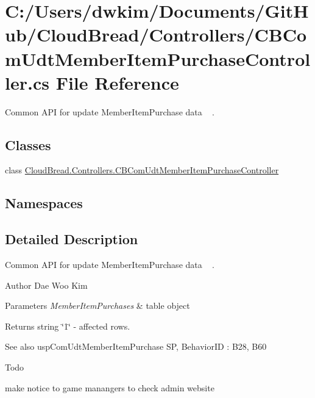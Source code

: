 \hypertarget{a00138}{}\section{C\+:/\+Users/dwkim/\+Documents/\+Git\+Hub/\+Cloud\+Bread/\+Controllers/\+C\+B\+Com\+Udt\+Member\+Item\+Purchase\+Controller.cs File Reference}
\label{a00138}


Common A\+PI for update Member\+Item\+Purchase data ~\newline
.  


\subsection*{Classes}
\begin{DoxyCompactItemize}
\item 
class \hyperlink{a00026}{Cloud\+Bread.\+Controllers.\+C\+B\+Com\+Udt\+Member\+Item\+Purchase\+Controller}
\end{DoxyCompactItemize}
\subsection*{Namespaces}
\begin{DoxyCompactItemize}
\end{DoxyCompactItemize}


\subsection{Detailed Description}
Common A\+PI for update Member\+Item\+Purchase data ~\newline
. 

\begin{DoxyAuthor}{Author}
Dae Woo Kim 
\end{DoxyAuthor}

\begin{DoxyParams}{Parameters}
{\em Member\+Item\+Purchases} & table object \\
\hline
\end{DoxyParams}
\begin{DoxyReturn}{Returns}
string \char`\"{}1\char`\"{} -\/ affected rows. 
\end{DoxyReturn}
\begin{DoxySeeAlso}{See also}
usp\+Com\+Udt\+Member\+Item\+Purchase SP, Behavior\+ID \+: B28, B60 
\end{DoxySeeAlso}
\begin{DoxyRefDesc}{Todo}
\item[\hyperlink{a00001__todo000007}{Todo}]make notice to game manangers to check admin website \end{DoxyRefDesc}
